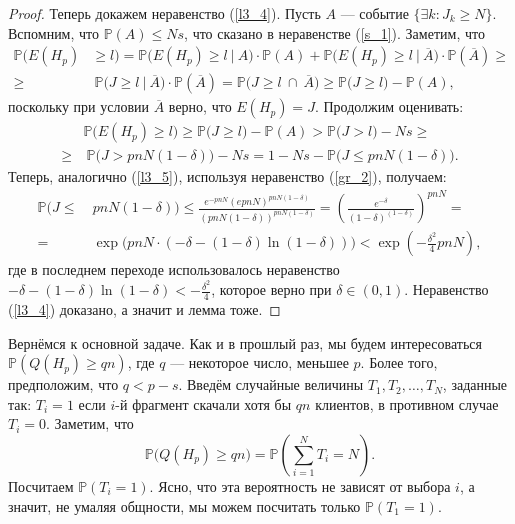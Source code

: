 \documentclass{matmex-diploma-custom}
\newcommand{\PRob}{\mathbb P}
\newcommand{\leqs}{\leqslant}
\newcommand{\geqs}{\geqslant}
\theoremstyle{named}
\begin{document}
\begin{proof}
Теперь докажем неравенство (\ref{l3_4}). Пусть $A$ --- событие $\{\exists k : J_k \geqs N\}$.
Вспомним, что $\PRob(A) \leqs Ns$, что сказано в неравенстве (\ref{s_1}). Заметим, что
\begin{equation}\begin{aligned}
\PRob\Big( E(H_p) &\geqs l \Big) = 
	\PRob\Big(E(H_p) \geqs l~\big|~A\Big) \cdot \PRob(A) + \PRob\Big(E(H_p) \geqs l~\big|~\overline{A}\Big) \cdot \PRob(\overline{A})
\geqs
\\
\geqs
&~\PRob\Big(J \geqs l~\big|~\overline{A}\Big) \cdot \PRob(\overline{A})
	=
\PRob\Big(J \geqs l~\cap~\overline{A} \Big) 
	\geqs
\PRob\Big(J \geqs l \Big) - \PRob(A),
\end{aligned}\end{equation}
поскольку при условии $\overline{A}$ верно, что $E(H_p) = J$. Продолжим оценивать:
\begin{equation}\begin{aligned}
&\PRob\Big( E(H_p) \geqs l \Big) 
	\geqs 
\PRob\Big(J \geqs l \Big) - \PRob(A) 
	>
\PRob\Big(J > l \Big) - Ns
	\geqs
\\
	\geqs
&~\PRob\Big(J > pnN(1-\delta) \Big) - Ns
	=
1 - Ns - \PRob\Big( J \leqs pnN(1-\delta)  \Big).
\end{aligned}\end{equation}
Теперь, аналогично (\ref{l3_5}), используя неравенство (\ref{gr_2}), получаем:
\begin{equation}\begin{aligned}
\PRob\big( J \leqs&~pnN(1-\delta) \big) 
	\leqs
\frac{
	e^{-pnN}(epnN)^{pnN(1-\delta)}
}{
	(pnN(1-\delta))^{pnN(1-\delta)}
}
	=
\left( \frac{e^{-\delta}}{(1-\delta)^{(1-\delta)}} \right)^{pnN}
	=
\\
	=
&~\exp\big(pnN \cdot (-\delta - (1-\delta)\ln(1-\delta)) \big)
	<
\exp\left(-\frac{\delta^2}{4}pnN\right),
\end{aligned}\end{equation}
где в последнем переходе использовалось неравенство $-\delta - (1-\delta)\ln(1-\delta) < - \frac{\delta^2}{4}$, 
которое верно при $\delta \in (0,1)$. Неравенство (\ref{l3_4}) доказано, а значит и лемма тоже.
\end{proof}

\smallskip

Вернёмся к основной задаче. 
Как и в прошлый раз, мы будем интересоваться
$\PRob(Q(H_p) \geqs qn)$, где $q$ --- некоторое число, меньшее $p$.
Более того, предположим, что $q < p - s$.
Введём случайные величины $T_1, T_2, \dots, T_N$, заданные так: $T_i = 1$ если $i$-й фрагмент скачали хотя бы $qn$ клиентов, 
в противном случае $T_i = 0$. Заметим, что 
\begin{equation}
\PRob\Big(Q(H_p) \geqs qn\Big) = \PRob\left(\sum\limits_{i=1}^N T_i = N\right).
\end{equation}
Посчитаем $\PRob(T_i = 1)$. Ясно, что эта вероятность не зависят от выбора $i$, а значит, 
не умаляя общности, мы можем посчитать только $\PRob(T_1 = 1)$.
\end{document}
